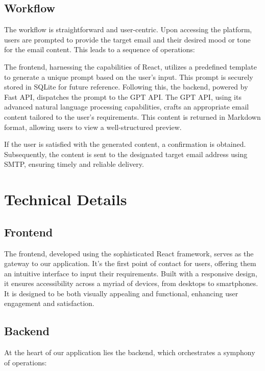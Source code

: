 \documentclass[12pt]{article}
\begin{document}
\subsection{Workflow}
The workflow is straightforward and user-centric. Upon accessing the platform, users are prompted to provide the target email and their desired mood or tone for the email content. This leads to a sequence of operations:

The frontend, harnessing the capabilities of React, utilizes a predefined template to generate a unique prompt based on the user's input. This prompt is securely stored in SQLite for future reference. Following this, the backend, powered by Fast API, dispatches the prompt to the GPT API. The GPT API, using its advanced natural language processing capabilities, crafts an appropriate email content tailored to the user's requirements. This content is returned in Markdown format, allowing users to view a well-structured preview.

If the user is satisfied with the generated content, a confirmation is obtained. Subsequently, the content is sent to the designated target email address using SMTP, ensuring timely and reliable delivery.

\section{Technical Details}

\subsection{Frontend}
The frontend, developed using the sophisticated React framework, serves as the gateway to our application. It's the first point of contact for users, offering them an intuitive interface to input their requirements. Built with a responsive design, it ensures accessibility across a myriad of devices, from desktops to smartphones. It is designed to be both visually appealing and functional, enhancing user engagement and satisfaction.

\subsection{Backend}
At the heart of our application lies the backend, which orchestrates a symphony of operations:
\end{document}
